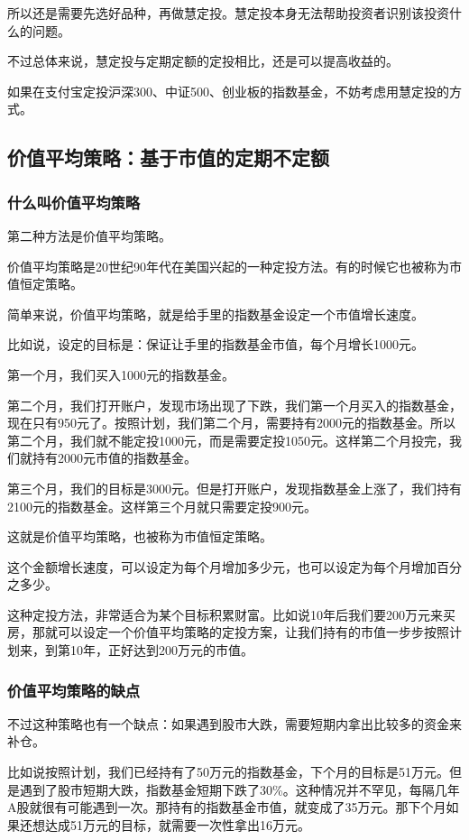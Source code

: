 所以还是需要先选好品种，再做慧定投。慧定投本身无法帮助投资者识别该投资什么的问题。

不过总体来说，慧定投与定期定额的定投相比，还是可以提高收益的。

如果在支付宝定投沪深300、中证500、创业板的指数基金，不妨考虑用慧定投的方式。

\subsection{价值平均策略：基于市值的定期不定额}
\subsubsection{什么叫价值平均策略}

第二种方法是价值平均策略。

价值平均策略是20世纪90年代在美国兴起的一种定投方法。有的时候它也被称为市值恒定策略。

简单来说，价值平均策略，就是给手里的指数基金设定一个市值增长速度。

比如说，设定的目标是：保证让手里的指数基金市值，每个月增长1000元。

{\kaishu 第一个月，我们买入1000元的指数基金。}

{\kaishu 第二个月，我们打开账户，发现市场出现了下跌，我们第一个月买入的指数基金，现在只有950元了。按照计划，我们第二个月，需要持有2000元的指数基金。所以第二个月，我们就不能定投1000元，而是需要定投1050元。这样第二个月投完，我们就持有2000元市值的指数基金。}

{\kaishu 第三个月，我们的目标是3000元。但是打开账户，发现指数基金上涨了，我们持有2100元的指数基金。这样第三个月就只需要定投900元。}

这就是价值平均策略，也被称为市值恒定策略。

这个金额增长速度，可以设定为每个月增加多少元，也可以设定为每个月增加百分之多少。

这种定投方法，非常适合为某个目标积累财富。比如说10年后我们要200万元来买房，那就可以设定一个价值平均策略的定投方案，让我们持有的市值一步步按照计划来，到第10年，正好达到200万元的市值。

\subsubsection{价值平均策略的缺点}

不过这种策略也有一个缺点：如果遇到股市大跌，需要短期内拿出比较多的资金来补仓。

比如说按照计划，我们已经持有了50万元的指数基金，下个月的目标是51万元。但是遇到了股市短期大跌，指数基金短期下跌了30\%。这种情况并不罕见，每隔几年A股就很有可能遇到一次。那持有的指数基金市值，就变成了35万元。那下个月如果还想达成51万元的目标，就需要一次性拿出16万元。

